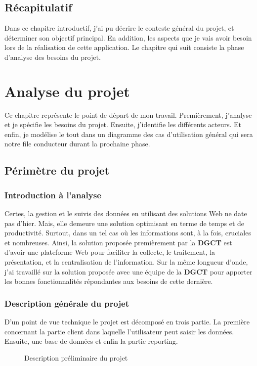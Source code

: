 \documentclass[a4paper]{report}
\begin{document}
\begin{doublespace}
	\section{Récapitulatif}
	Dans ce chapitre introductif, j'ai pu décrire le conteste général du
	projet, et
	déterminer son objectif principal. En addition, les aspects que je vais
	avoir besoin lors de la réalisation de cette application.
	Le chapitre qui suit consiste la phase d'analyse des besoins du projet.
	\newpage
	\chapter{Analyse du projet}
	\fancyhead[L]{\hspace*{5cm}}

	Ce chapitre représente le point de départ de mon travail. Premièrement,
	j'analyse et
	je spécifie les besoins du projet. Ensuite, j'identifie les différents
	acteurs. Et enfin, je
	modélise le tout dans un diagramme des cas d’utilisation général qui
	sera notre file conducteur
	durant la prochaine phase.
	\section{Périmètre du projet}
	\subsection{Introduction à l'analyse}
	Certes, la gestion et le suivis des données en utilisant des solutions
	Web ne date pas d'hier. Mais,
	elle demeure une solution optimisant en terme de temps et de
	productivité. Surtout,
	dans un tel cas où les informations sont, à la fois, cruciales et
	nombreuses. Ainsi, la solution proposée premièrement par la \textbf{DGCT} est
	d'avoir une plateforme Web pour faciliter la collecte,
	le traitement, la présentation, et la centralisation de l'information.
	Sur la même longueur d'onde, j'ai
	travaillé sur la solution proposée avec une équipe de la \textbf{DGCT}
	pour apporter les bonnes
	fonctionnalités répondantes aux besoins de cette dernière.
	\subsection{Description générale du projet}
	D'un point de vue technique le projet est décomposé en trois partie. La
	première concernant la partie client dans laquelle l'utilisateur peut saisir
	les données. Ensuite, une base de données et enfin la partie reporting.
	\begin{figure}[H]
		\begin{center}
			\caption{Description préliminaire du projet}
		\end{center}
	\end{figure}

\end{doublespace}
\end{document}
